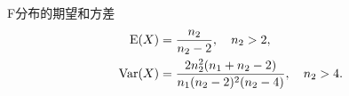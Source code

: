 \begin{corollary}
	F分布的期望和方差
	\begin{subequations}
		\begin{align}
			\operatorname{E}(X) &= \frac{n_2}{n_2 - 2},\quad n_2 > 2,\\
			\operatorname{Var}(X) &= \frac{2n_2^2(n_1 + n_2 - 2)}{n_1(n_2 - 2)^2(n_2 - 4)},\quad n_2 > 4.
		\end{align}
	\end{subequations}
\end{corollary}



